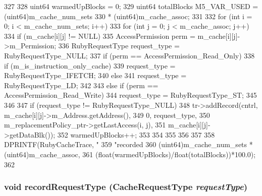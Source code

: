 \begin{DoxyCode}
327 {
328     uint64 warmedUpBlocks = 0;
329     uint64 totalBlocks M5_VAR_USED = (uint64)m_cache_num_sets
330                                                   * (uint64)m_cache_assoc;
331 
332     for (int i = 0; i < m_cache_num_sets; i++) {
333         for (int j = 0; j < m_cache_assoc; j++) {
334             if (m_cache[i][j] != NULL) {
335                 AccessPermission perm = m_cache[i][j]->m_Permission;
336                 RubyRequestType request_type = RubyRequestType_NULL;
337                 if (perm == AccessPermission_Read_Only) {
338                     if (m_is_instruction_only_cache) {
339                         request_type = RubyRequestType_IFETCH;
340                     } else {
341                         request_type = RubyRequestType_LD;
342                     }
343                 } else if (perm == AccessPermission_Read_Write) {
344                     request_type = RubyRequestType_ST;
345                 }
346 
347                 if (request_type != RubyRequestType_NULL) {
348                     tr->addRecord(cntrl, m_cache[i][j]->m_Address.getAddress(),
349                                   0, request_type,
350                                   m_replacementPolicy_ptr->getLastAccess(i, j),
351                                   m_cache[i][j]->getDataBlk());
352                     warmedUpBlocks++;
353                 }
354             }
355         }
356     }
357 
358     DPRINTF(RubyCacheTrace, "%
359             "recorded %
360             (uint64)m_cache_num_sets * (uint64)m_cache_assoc,
361             (float(warmedUpBlocks)/float(totalBlocks))*100.0);
362 }
\end{DoxyCode}
\hypertarget{classCacheMemory_a4798ec530ab14c83a290b9d372e31a9d}{
\subsubsection[{recordRequestType}]{\setlength{\rightskip}{0pt plus 5cm}void recordRequestType (CacheRequestType {\em requestType})}}
\label{classCacheMemory_a4798ec530ab14c83a290b9d372e31a9d}




